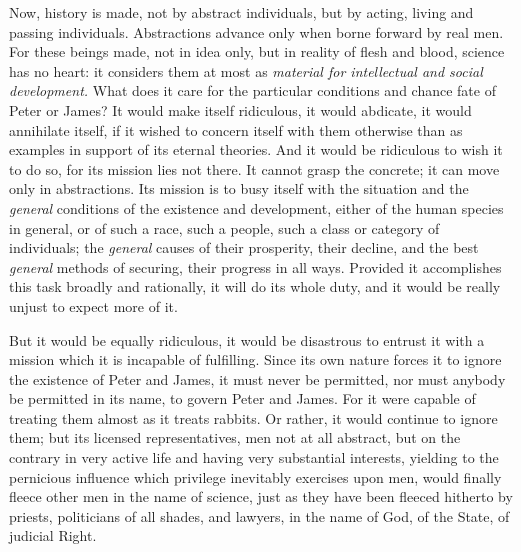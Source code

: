 \documentclass[12pt]{report}
\begin{document}
Now, history is made, not by abstract individuals, but by acting, living and passing individuals. Abstractions advance only when borne forward by real men. For these beings made, not in idea only, but in reality of flesh and blood, science has no heart: it considers them at most as \emph{material for intellectual and social development.} What does it care for the particular conditions and chance fate of Peter or James? It would make itself ridiculous, it would abdicate, it would annihilate itself, if it wished to concern itself with them otherwise than as examples in support of its eternal theories. And it would be ridiculous to wish it to do so, for its mission lies not there. It cannot grasp the concrete; it can move only in abstractions. Its mission is to busy itself with the situation and the \emph{general} conditions of the existence and development, either of the human species in general, or of such a race, such a people, such a class or category of individuals; the \emph{general} causes of their prosperity, their decline, and the best \emph{general} methods of securing, their progress in all ways. Provided it accomplishes this task broadly and rationally, it will do its whole duty, and it would be really unjust to expect more of it.


But it would be equally ridiculous, it would be disastrous to entrust it with a mission which it is incapable of fulfilling. Since its own nature forces it to ignore the existence of Peter and James, it must never be permitted, nor must anybody be permitted in its name, to govern Peter and James. For it were capable of treating them almost as it treats rabbits. Or rather, it would continue to ignore them; but its licensed representatives, men not at all abstract, but on the contrary in very active life and having very substantial interests, yielding to the pernicious influence which privilege inevitably exercises upon men, would finally fleece other men in the name of science, just as they have been fleeced hitherto by priests, politicians of all shades, and lawyers, in the name of God, of the State, of judicial Right.
\end{document}
